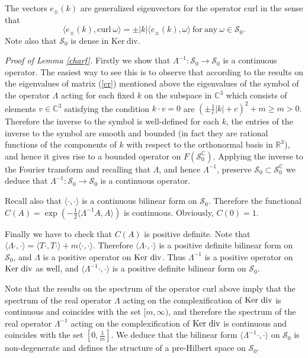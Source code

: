 \documentclass{amsart}
\begin{document}
The vectors $e_{\pm}(k)$ are generalized eigenvectors for the operator $\mathrm{curl}$
in the sense that
\begin{equation}\label{eigen}
\langle e_{\pm}(k),\mathrm{curl}~\omega\rangle =\pm|k|\langle e_{\pm}(k),\omega\rangle ~\mathrm{for~any}~\omega \in \mathcal{S}_0.
\end{equation}
Note also that $\mathcal{S}_0$ is dense in $\mathrm{Ker}~\mathrm{div}$.

{\em Proof of Lemma \ref{charf}.}
Firstly we show that $\Lambda^{-1}:\mathcal{S}_0\rightarrow \mathcal{S}_0$ is a continuous operator. The easiest way to see this is to observe that according to the results on the eigenvalues of matrix (\ref{cr}) mentioned above the eigenvalues of the symbol of the operator $\Lambda$ acting for each fixed $k$ on the subspace in $\mathbb{C}^3$ which consists of elements $v\in \mathbb{C}^3$ satisfying the condition $k\cdot v=0$ are $(\pm\frac1c|k|+c)^2+m\geq m>0$. Therefore the inverse to the symbol is well-defined for each $k$, the entries of the inverse to the symbol are smooth and bounded (in fact they are rational functions of the components of $k$ with respect to the orthonormal basis in $\mathbb{R}^3$), and hence it gives rise to a bounded operator on $F(\mathcal{S}_0^{\mathbb{C}})$. Applying the inverse to the Fourier transform and recalling that $\Lambda$, and hence $\Lambda^{-1}$, preserve $\mathcal{S}_0\subset \mathcal{S}_0^{\mathbb{C}}$ we deduce that $\Lambda^{-1}:\mathcal{S}_0\rightarrow \mathcal{S}_0$ is a continuous operator.  

Recall also that $\langle \cdot,\cdot\rangle $ is a continuous bilinear form on $\mathcal{S}_0$. Therefore the functional $C(A)=\exp(-\frac12\langle \Lambda^{-1} A,A\rangle )$ is continuous. Obviously, $C(0)=1$.

Finally we have to check that $C(A)$ is positive definite.
Note that  $\langle \Lambda \cdot,\cdot\rangle =\langle T\cdot,T\cdot\rangle +m\langle \cdot,\cdot\rangle $. Therefore  $\langle \Lambda \cdot,\cdot\rangle $ is a positive definite bilinear form on $\mathcal{S}_0$, and $\Lambda$ is a positive operator on ${\rm Ker~div}$. Thus $\Lambda^{-1}$ is a positive operator on ${\rm Ker~div}$ as well, and $\langle \Lambda^{-1} \cdot,\cdot\rangle $ is a positive definite bilinear form on $\mathcal{S}_0$. 

Note that the results on the spectrum of the operator curl above imply that the spectrum of the real operator $\Lambda$ acting on the complexification of ${\rm Ker~div}$ is continuous and coincides with the set $[m,\infty)$, and therefore the spectrum of the real operator $\Lambda^{-1}$ acting on the complexification of ${\rm Ker~div}$ is continuous and coincides with the set $[0,\frac1m]$.
We deduce that the bilinear form $\langle \Lambda^{-1} \cdot,\cdot\rangle $ on $\mathcal{S}_0$ is non-degenerate and defines the structure of a pre-Hilbert space on $\mathcal{S}_0$.
\end{document}

